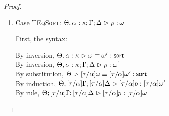 \begin{proof}
\begin{enumerate}
  For the semantics, consider $\interp{\judgeA[\Theta; {[\tau/\alpha]}\Gamma; {[\tau/\alpha]}\Delta]{{[\tau/\alpha]}(e \pointsto_A e')}{\assert}}\;\theta\;\gamma\;\delta$
  \begin{eqnproof}
          {Semantics}
          {Induction}
          {Semantics}
  \end{eqnproof}
  The correctness of the application of $\gamma$ and $\delta$ follows from the equations for
  contexts under substitution. 

\item Case \textsc{TEqSort}: $\judgeA[\Theta, \alpha:\kappa; \Gamma; \Delta]{p}{\omega}$
  
  First, the syntax:
  \begin{tabbedproof}
    \oo By inversion, $\judgeSortEq[\Theta, \alpha:\kappa]{\omega}{\omega'}$ \\
    \oo By inversion, $\judgeA[\Theta, \alpha:\kappa; \Gamma; \Delta]{p}{\omega'}$ \\
    \oo By substitution, $\judgeSortEq{{[\tau/\alpha]}\omega}{{[\tau/\alpha]}\omega'}$ \\
    \oo By induction, $\judgeA[\Theta; {[\tau/\alpha]}\Gamma; {[\tau/\alpha]}\Delta]{{[\tau/\alpha]}p}{{[\tau/\alpha]}\omega'}$ \\
    \oo By rule, $\judgeA[\Theta; {[\tau/\alpha]}\Gamma; {[\tau/\alpha]}\Delta]{{[\tau/\alpha]}p}{{[\tau/\alpha]}\omega}$ \\
  \end{tabbedproof}


\end{enumerate}
\end{proof}
